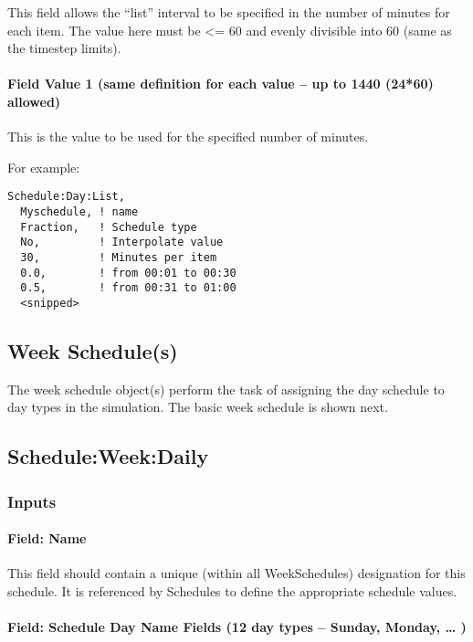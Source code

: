This field allows the ``list'' interval to be specified in the number of minutes for each item. The value here must be \textless{}= 60 and evenly divisible into 60 (same as the timestep limits).

\paragraph{Field Value 1 (same definition for each value -- up to 1440 (24*60) allowed)}\label{field-value-1-same-definition-for-each-value-up-to-1440-2460-allowed}

This is the value to be used for the specified number of minutes.

For example:

\begin{lstlisting}
Schedule:Day:List,
  Myschedule, ! name
  Fraction,   ! Schedule type
  No,         ! Interpolate value
  30,         ! Minutes per item
  0.0,        ! from 00:01 to 00:30
  0.5,        ! from 00:31 to 01:00
  <snipped>
\end{lstlisting}

\subsection{Week Schedule(s)}\label{week-schedules}

The week schedule object(s) perform the task of assigning the day schedule to day types in the simulation. The basic week schedule is shown next.

\subsection{Schedule:Week:Daily}\label{scheduleweekdaily}

\subsubsection{Inputs}\label{inputs-4-029}

\paragraph{Field: Name}\label{field-name-4-025}

This field should contain a unique (within all WeekSchedules) designation for this schedule. It is referenced by Schedules to define the appropriate schedule values.

\paragraph{Field: Schedule Day Name Fields (12 day types -- Sunday, Monday, \ldots{} )}\label{field-schedule-day-name-fields-12-day-types-sunday-monday}

